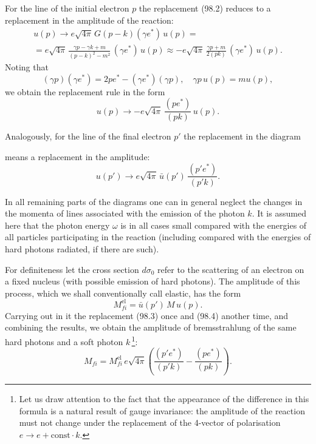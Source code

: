 For the line of the initial electron $p$ the replacement (98.2) reduces to a replacement in the amplitude of the reaction:
\begin{gather*}
u(p) \to e\sqrt{4\pi}\,G(p-k)(\gamma e^*)\,u(p) = {} \\
= e\sqrt{4\pi}\,\frac{\gamma p - \gamma k + m}{(p-k)^2 - m^2}\,(\gamma e^*)\,u(p) \approx -e\sqrt{4\pi}\,\frac{\gamma p + m}{2(pk)}\,(\gamma e^*)\,u(p).
\end{gather*}
Noting that
\[
(\gamma p)(\gamma e^*) = 2pe^* - (\gamma e^*)(\gamma p), \quad \gamma p\,u(p) = mu(p),
\]
we obtain the replacement rule in the form
\begin{equation}
u(p) \to -e\sqrt{4\pi}\,\frac{(pe^*)}{(pk)}\,u(p).
\label{eq:98.3}
\end{equation}

Analogously, for the line of the final electron $p'$ the replacement in the diagram


\noindent means a replacement in the amplitude:
\begin{equation}
u(p') \to e\sqrt{4\pi}\,\bar{u}(p')\,\frac{(p'e^*)}{(p'k)}.
\label{eq:98.4}
\end{equation}

In all remaining parts of the diagrams one can in general neglect the changes in the momenta of lines associated with the emission of the photon $k$. It is assumed here that the photon energy $\omega$ is in all cases small compared with the energies of all particles participating in the reaction (including compared with the energies of hard photons radiated, if there are such).

For definiteness let the cross section $d\sigma_0$ refer to the scattering of an electron on a fixed nucleus (with possible emission of hard photons). The amplitude of this process, which we shall conventionally call elastic, has the form
\[
M_{fi}^\text{el} = \bar{u}(p')\,M\,u(p).
\]
Carrying out in it the replacement (98.3) once and (98.4) another time, and combining the results, we obtain the amplitude of bremsstrahlung of the same hard photons and a soft photon $k$\,\footnote{Let us draw attention to the fact that the appearance of the difference in this formula is a natural result of gauge invariance: the amplitude of the reaction must not change under the replacement of the 4-vector of polarisation $e \to e + \text{const}\cdot k$.}:
\begin{equation}
M_{fi} = M_{fi}^\text{el}\,e\sqrt{4\pi}\!\left(\frac{(p'e^*)}{(p'k)} - \frac{(pe^*)}{(pk)}\right).
\label{eq:98.5}
\end{equation}

